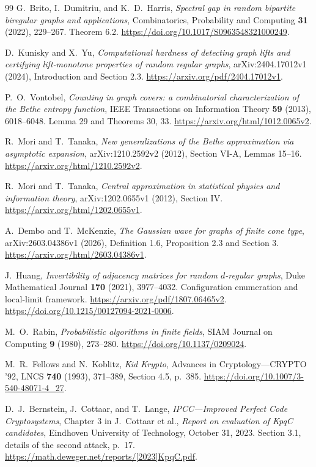 \begin{thebibliography}{99}
G.~Brito, I.~Dumitriu, and K.~D.~Harris,
\emph{Spectral gap in random bipartite biregular graphs and applications},
Combinatorics, Probability and Computing \textbf{31} (2022), 229--267.
Theorem 6.2. \url{https://doi.org/10.1017/S0963548321000249}.

D.~Kunisky and X.~Yu, \emph{Computational hardness of detecting graph
lifts and certifying lift-monotone properties of random regular graphs},
arXiv:2404.17012v1 (2024), Introduction and Section 2.3.
\url{https://arxiv.org/pdf/2404.17012v1}.

P.~O.~Vontobel, \emph{Counting in graph covers: a combinatorial
characterization of the Bethe entropy function},
IEEE Transactions on Information Theory \textbf{59} (2013), 6018--6048.
Lemma 29 and Theorems 30, 33.
\url{https://arxiv.org/html/1012.0065v2}.

R.~Mori and T.~Tanaka, \emph{New generalizations of the Bethe approximation
via asymptotic expansion}, arXiv:1210.2592v2 (2012), Section VI-A,
Lemmas 15--16. \url{https://arxiv.org/html/1210.2592v2}.

R.~Mori and T.~Tanaka, \emph{Central approximation in statistical physics
and information theory}, arXiv:1202.0655v1 (2012), Section IV.
\url{https://arxiv.org/html/1202.0655v1}.

A.~Dembo and T.~McKenzie, \emph{The Gaussian wave for graphs of finite
cone type}, arXiv:2603.04386v1 (2026), Definition 1.6,
Proposition 2.3 and Section 3.
\url{https://arxiv.org/html/2603.04386v1}.

J.~Huang, \emph{Invertibility of adjacency matrices for random
$d$-regular graphs}, Duke Mathematical Journal \textbf{170} (2021),
3977--4032. Configuration enumeration and local-limit framework.
\url{https://arxiv.org/pdf/1807.06465v2}.
\url{https://doi.org/10.1215/00127094-2021-0006}.

M.~O.~Rabin, \emph{Probabilistic algorithms in finite fields},
SIAM Journal on Computing \textbf{9} (1980), 273--280.
\url{https://doi.org/10.1137/0209024}.


M.~R.~Fellows and N.~Koblitz, \emph{Kid Krypto},
Advances in Cryptology---CRYPTO '92, LNCS \textbf{740} (1993),
371--389, Section 4.5, p.~385.
\url{https://doi.org/10.1007/3-540-48071-4_27}.

D.~J.~Bernstein, J.~Cottaar, and T.~Lange,
\emph{IPCC---Improved Perfect Code Cryptosystems}, Chapter 3 in
J.~Cottaar et al., \emph{Report on evaluation of KpqC candidates},
Eindhoven University of Technology, October 31, 2023.
Section 3.1, details of the second attack, p.~17.
\url{https://math.deweger.net/reports/[2023]KpqC.pdf}.


\end{thebibliography}
